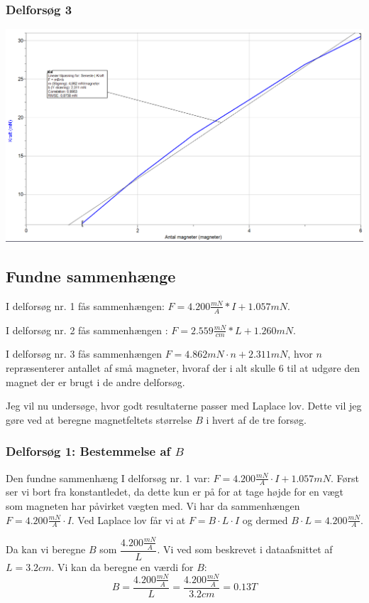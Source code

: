 \documentclass[10pt,a4paper]{article}
\theoremstyle{break}
\theoremstyle{nonumberplain}
\begin{document}
\subsubsection{Delforsøg 3}
\begin{center}
\includegraphics[scale=0.5]{graf3}
\end{center}

\subsection{Fundne sammenhænge}
I delforsøg nr. 1 fås sammenhængen: $F=4.200\frac{mN}{A}*I+1.057mN$.

I delforsøg nr. 2 fås sammenhængen : $F = 2.559\frac{mN}{cm}*L + 1.260mN$.

I delforsøg nr. 3 fås sammenhængen $F = 4.862mN\cdot n + 2.311 mN$, hvor $n$ repræsenterer antallet af små magneter, hvoraf der i alt skulle 6 til at udgøre den magnet der er brugt i de andre delforsøg. 

Jeg vil nu undersøge, hvor godt resultaterne passer med Laplace lov. 
Dette vil jeg gøre ved at beregne magnetfeltets størrelse $B$ i hvert af de tre forsøg.

\subsubsection{Delforsøg 1: Bestemmelse af $B$}
Den fundne sammenhæng I delforsøg nr. 1 var: $F=4.200\frac{mN}{A}\cdot I+1.057mN$. 
Først ser vi bort fra konstantledet, da dette kun er på for at tage højde for en vægt som magneten har påvirket vægten med.
Vi har da sammenhængen $F=4.200\frac{mN}{A}\cdot I$. 
Ved Laplace lov får vi at $F=B\cdot L \cdot I$ og dermed 
$B\cdot L = 4.200\frac{mN}{A}$. 

Da kan vi beregne $B$ som $\dfrac{4.200\frac{mN}{A}}{L}$.
Vi ved som beskrevet i dataafsnittet af $L=3.2cm$. 
Vi kan da beregne en værdi for $B$:
$$B = \dfrac{4.200\frac{mN}{A}}{L} = \dfrac{4.200\frac{mN}{A}}{3.2cm} = 0.13T$$
\end{document}
